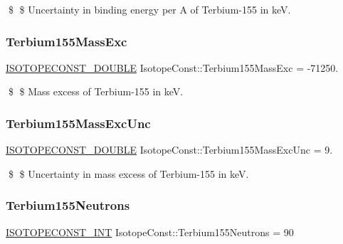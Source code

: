 \$ \$ Uncertainty in binding energy per A of Terbium-\/155 in keV. \mbox{\label{group___isotope_const-_terbium-_tb155_ga7786ff538463e466750545dcabf0daba}} 
\subsubsection{\texorpdfstring{Terbium155\+Mass\+Exc}{Terbium155MassExc}}
{\footnotesize\ttfamily \mbox{\hyperlink{group___isotope_const-_macros_ga8f45a7272ce02c0b4c65c44636ed719a}{I\+S\+O\+T\+O\+P\+E\+C\+O\+N\+S\+T\+\_\+\+D\+O\+U\+B\+LE}} Isotope\+Const\+::\+Terbium155\+Mass\+Exc = -\/71250.}

\$ \$ Mass excess of Terbium-\/155 in keV. \mbox{\label{group___isotope_const-_terbium-_tb155_gafd67fe88b84b4673fccf3f8f480ea2c3}} 
\subsubsection{\texorpdfstring{Terbium155\+Mass\+Exc\+Unc}{Terbium155MassExcUnc}}
{\footnotesize\ttfamily \mbox{\hyperlink{group___isotope_const-_macros_ga8f45a7272ce02c0b4c65c44636ed719a}{I\+S\+O\+T\+O\+P\+E\+C\+O\+N\+S\+T\+\_\+\+D\+O\+U\+B\+LE}} Isotope\+Const\+::\+Terbium155\+Mass\+Exc\+Unc = 9.}

\$ \$ Uncertainty in mass excess of Terbium-\/155 in keV. \mbox{\label{group___isotope_const-_terbium-_tb155_gae0cd97f41bbf48a2e2b05094b4e7dd66}} 
\subsubsection{\texorpdfstring{Terbium155\+Neutrons}{Terbium155Neutrons}}
{\footnotesize\ttfamily \mbox{\hyperlink{group___isotope_const-_macros_ga5f18360b3e99483a35c32d789e62621c}{I\+S\+O\+T\+O\+P\+E\+C\+O\+N\+S\+T\+\_\+\+I\+NT}} Isotope\+Const\+::\+Terbium155\+Neutrons = 90}

